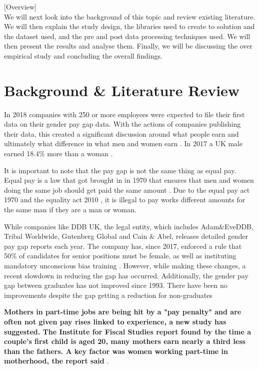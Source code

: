 \documentclass{sigchi}
\begin{document}
[Overview]\\
	We will next look into the background of this topic and review existing literature. We will then explain the study design, the libraries used to create to solution and the dataset used, and the pre and post data processing techniques used. We will then present the results and analyse them. Finally, we will be discussing the over empirical study and concluding the overall findings.

\section{Background \& Literature Review}
	In 2018 companies with 250 or more employees were expected to file their first data on their gender pay gap data. With the actions of companies publishing their data, this created a significant discussion around what people earn and ultimately what difference in what men and women earn \cite{bbc_gender_pay_gap}. In 2017 a UK male earned 18.4\% more than a woman \cite{ons_gender_pay_gap_17}. 
	
	It is important to note that the pay gap is not the same thing as equal pay. Equal pay is a law that got brought in in 1970 that ensures that men and women doing the same job should get paid the same amount \cite{bbc_gender_pay_gap}. Due to the equal pay act 1970 \cite{equal_pay_act_1070} and the equality act 2010 \cite{equal_act_2010}, it is illegal to pay works different amounts for the same man if they are a man or woman.
	
	While companies like DDB UK, the legal entity, which includes Adam\&EveDDB, Tribal Worldwide, Gutenberg Global and Cain \& Abel, releases detailed gender pay gap reports each year. The company has, since 2017, enforced a rule that 50\% of candidates for senior positions must be female, as well as instituting mandatory unconscious bias training \cite{uk_gender_gap}. However, while making these changes, a recent slowdown in reducing the gap has occurred. Additionally, the gender pay gap between graduates has not improved since 1993. There have been no improvements despite the gap getting a reduction for non-graduates \cite{bbc_mothers_suffering}
	
	\textbf{Mothers in part-time jobs are being hit by a "pay penalty" and are often not given pay rises linked to experience, a new study has suggested.
	The Institute for Fiscal Studies report found by the time a couple's first child is aged 20, many mothers earn nearly a third less than the fathers.
	A key factor was women working part-time in motherhood, the report said} \cite{bbc_mothers_suffering}.
	
\end{document}
